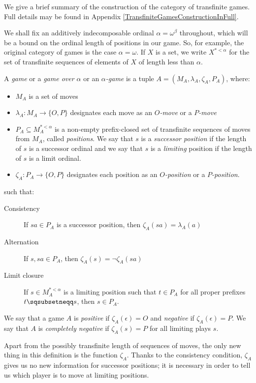 \documentclass[a4paper,UKenglish]{lipics-v2016}
\theoremstyle{plain}
\theoremstyle{definition}
\newcommand*\from{\colon}
\newcommand{\OP}{\{O,P\}}
\newcommand{\emptyplay}{\epsilon}
\newcommand{\pprefix}{\sqsubsetneqq}
\renewcommand{\subset}{\subseteq}
\begin{document}
We give a brief summary of the construction of the category of transfinite games.  Full details may be found in Appendix \ref{TransfiniteGamesConstructionInFull}.

We shall fix an additively indecomposable ordinal $\alpha = \omega^\beta$ throughout, which will be a bound on the ordinal length of positions in our game.  So, for example, the original category of games is the case $\alpha=\omega$.  If $X$ is a set, we write $X^{*<\alpha}$ for the set of transfinite sequences of elements of $X$ of length less than $\alpha$.

\begin{definition}
  A \emph{game} or a \emph{game over $\alpha$} or an \emph{$\alpha$-game} is a tuple $A=(M_A,\lambda_A,\zeta_A,P_A)$, where:
  \begin{itemize}
    \item $M_A$ is a set of moves
    \item $\lambda_A\from M_A\to\OP$ designates each move as an \emph{$O$-move} or a \emph{$P$-move}
    \item $P_A\subset M_A^{*<\alpha}$ is a non-empty prefix-closed set of transfinite sequences of moves from $M_A$, called \emph{positions}.  We say that $s$ is a \emph{successor position} if the length of $s$ is a successor ordinal and we say that $s$ is a \emph{limiting} position if the length of $s$ is a limit ordinal.
    \item $\zeta_A\from P_A\to\OP$ designates each position as an \emph{$O$-position} or a \emph{$P$-position}.
  \end{itemize}
  such that:
  \begin{description}
    \item[Consistency] If $sa\in P_A$ is a successor position, then $\zeta_A(sa) = \lambda_A(a)$
    \item[Alternation] If $s,sa\in P_A$, then $\zeta_A(s) = \neg\zeta_A(sa)$
    \item[Limit closure] If $s\in M_A^{*<\alpha}$ is a limiting position such that $t\in P_A$ for all proper prefixes $t\pprefix s$, then $s\in P_A$.
  \end{description}

  We say that a game $A$ is \emph{positive} if $\zeta_A(\emptyplay)=O$ and \emph{negative} if $\zeta_A(\emptyplay) = P$.  We say that $A$ is \emph{completely negative} if $\zeta_A(s)=P$ for all limiting plays $s$.  
\end{definition}

Apart from the possibly transfinite length of sequences of moves, the only new thing in this definition is the function $\zeta_A$.  Thanks to the consistency condition, $\zeta_A$ gives us no new information for successor positions; it is necessary in order to tell us which player is to move at limiting positions.
\end{document}
